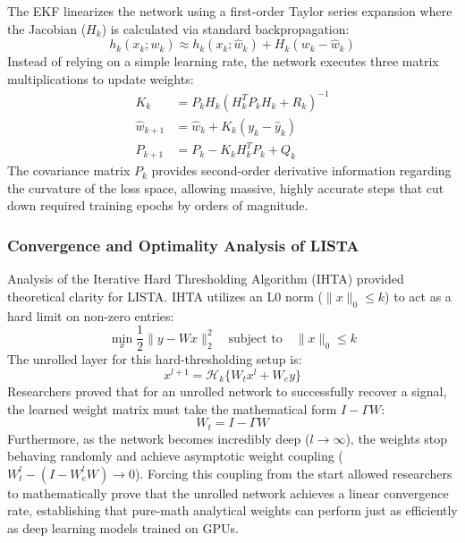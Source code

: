 \documentclass[conference]{IEEEtran}
\begin{document}
The EKF linearizes the network using a first-order Taylor series expansion where the Jacobian ($H_k$) is calculated via standard backpropagation:
\begin{equation}
h_k(x_k; w_k) \approx h_k(x_k; \hat{w}_k) + H_k(w_k - \hat{w}_k)
\end{equation}
Instead of relying on a simple learning rate, the network executes three matrix multiplications to update weights:
\begin{align}
K_k &= P_k H_k (H_k^T P_k H_k + R_k)^{-1} \\
\hat{w}_{k+1} &= \hat{w}_k + K_k (y_k - \hat{y}_k) \\
P_{k+1} &= P_k - K_k H_k^T P_k + Q_k
\end{align}
The covariance matrix $P_k$ provides second-order derivative information regarding the curvature of the loss space, allowing massive, highly accurate steps that cut down required training epochs by orders of magnitude. 



\subsubsection{Convergence and Optimality Analysis of LISTA}
Analysis of the Iterative Hard Thresholding Algorithm (IHTA) provided theoretical clarity for LISTA. IHTA utilizes an L0 norm ($\|x\|_0 \le k$) to act as a hard limit on non-zero entries:
\begin{equation}
\min_x \frac{1}{2}\|y - Wx\|_2^2 \quad \text{subject to} \quad \|x\|_0 \le k
\end{equation}
The unrolled layer for this hard-thresholding setup is:
\begin{equation}
x^{l+1} = \mathcal{H}_k\{W_t x^l + W_e y\}
\end{equation}
Researchers proved that for an unrolled network to successfully recover a signal, the learned weight matrix must take the mathematical form $I - \Gamma W$:
\begin{equation}
W_t = I - \Gamma W
\end{equation}
Furthermore, as the network becomes incredibly deep ($l \to \infty$), the weights stop behaving randomly and achieve asymptotic weight coupling ($W_t^l - (I - W_e^l W) \to 0$). Forcing this coupling from the start allowed researchers to mathematically prove that the unrolled network achieves a linear convergence rate, establishing that pure-math analytical weights can perform just as efficiently as deep learning models trained on GPUs.
\end{document}

